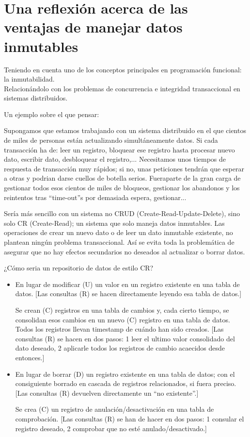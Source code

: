 \documentclass[spanish,12pt,a4paper,final,oneside]{book}
\begin{document}
\newpage
\section{Una reflexión acerca de las ventajas de manejar datos inmutables}

Teniendo en cuenta uno de los conceptos principales en programación funcional: la inmutabilidad.
\\Relacionándolo con los problemas de concurrencia e integridad transaccional en sistemas distribuidos.

Un ejemplo sobre el que pensar:

Supongamos que estamos trabajando con un sistema distribuido en el que cientos de miles de personas están actualizando simultáneamente datos. Si cada transacción ha de: leer un registro, bloquear ese registro hasta procesar nuevo dato, escribir dato, desbloquear el registro,... 
Necesitamos unos tiempos de respuesta de transacción muy rápidos; si no, unas peticiones tendrán que esperar a otras y podrian darse cuellos de botella serios. Fueraparte de la gran carga de gestionar todos esos cientos de miles de bloqueos, gestionar los abandonos y los reintentos tras ``time-out''s por demasiada espera, gestionar...

Sería más sencillo con un sistema no CRUD (Create-Read-Update-Delete), sino solo CR (Create-Read); un sistema que solo maneja datos inmutables. Las operaciones de crear un nuevo dato o de leer un dato inmutable existente, no plantean ningún problema transaccional. Así se evita toda la problemática de asegurar que no hay efectos secundarios no deseados al actualizar o borrar datos. 

¿Cómo seria un repositorio de datos de estilo CR?
\begin{itemize}

\item En lugar de modificar (U) un valor en un registro existente en una tabla de datos. [Las consultas (R) se hacen directamente leyendo esa tabla de datos.]

Se crean (C) registros en una tabla de cambios y, cada cierto tiempo, se consolidan esos cambios en un nuevo (C) registro en una tabla de datos. Todos los registros llevan timestamp de cuándo han sido creados. [Las consultas (R) se hacen en dos pasos: 1 leer el ultimo valor consolidado del dato deseado, 2 aplicarle todos los registros de cambio acaecidos desde entonces.]

\item En lugar de borrar (D) un registro existente en una tabla de datos; con el consiguiente borrado en cascada de registros relacionados, si fuera preciso. [Las consultas (R) devuelven directamente un ``no existente''.]

Se crea (C) un registro de anulación/desactivación en una tabla de comprobación. [Las consultas (R) se han de hacer en dos pasos: 1 consular el registro deseado, 2 comprobar que no esté anulado/desactivado.]

\end{itemize}
\end{document}
